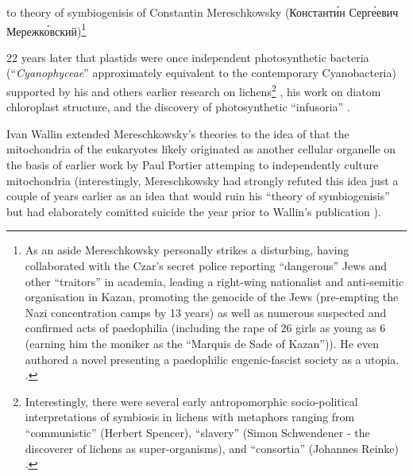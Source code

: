 to theory of symbiogenisis of Constantin Mereschkowsky (Константи́н Серге́евич Мережко́вский)\footnote{As 
    an aside Mereschkowsky personally strikes a disturbing, having
    collaborated with the Czar's secret police reporting ``dangerous''
    Jews and other ``traitors'' in academia, leading a right-wing nationalist
    and anti-semitic organisation in Kazan, promoting the genocide of the Jews
    (pre-empting the Nazi concentration camps by 13 years) as well as numerous suspected and 
    confirmed acts of paedophilia (including the rape of 26 girls as young as 6 
    (earning him the moniker as the ``Marquis de Sade of Kazan'')).  
    He even authored a novel presenting a paedophilic eugenic-fascist
    society as a utopia.  
    \citep{Sapp2002}.}

22 years later that plastids were once independent photosynthetic bacteria 
(``\textit{Cyanophyceae}'' approximately equivalent to the contemporary Cyanobacteria) 
supported by his and others earlier research on lichens\footnote{Interestingly, 
    there were several early antropomorphic socio-political 
    interpretations of symbiosis in lichens with metaphors ranging from ``communistic'' 
    (Herbert Spencer), ``slavery'' (Simon Schwendener - the discoverer of lichens as
    super-organisms), and ``consortia'' (Johannes Reinke) \citep{Sapp2002}.}
, his work on diatom chloroplast structure, and the discovery of 
photosynthetic ``infusoria'' \citep{Mereschkowsky1905,Martin1999a,Sapp2002}. 

Ivan Wallin extended Mereschkowsky's theories to the idea of that the mitochondria
of the eukaryotes likely originated as another cellular organelle \citep{Wallin1922} 
on the basis of earlier work by Paul Portier attemping to independently
culture mitochondria \citep{Sapp2002} (interestingly, 
Mereschkowsky had strongly refuted this idea just a couple of years earlier as 
an idea that would ruin his ``theory of symbiogenisis'' \citep{Sapp2002} but 
had elaborately comitted suicide the year prior to Wallin's publication \citep{Sapp2002}).

